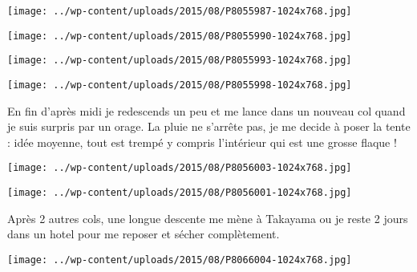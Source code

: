  

\begin{center} \texttt{[image: ../wp-content/uploads/2015/08/P8055987-1024x768.jpg]} \end{center}

 

 

\begin{center} \texttt{[image: ../wp-content/uploads/2015/08/P8055990-1024x768.jpg]} \end{center}

 

 

\begin{center} \texttt{[image: ../wp-content/uploads/2015/08/P8055993-1024x768.jpg]} \end{center}

 

 

\begin{center} \texttt{[image: ../wp-content/uploads/2015/08/P8055998-1024x768.jpg]} \end{center}

 

 En fin d'après midi je redescends un peu et me lance dans un nouveau col quand je suis surpris par un orage. La pluie ne s'arrête pas, je me decide à poser la tente : idée moyenne, tout est trempé y compris l'intérieur qui est une grosse flaque ! 

 

\begin{center} \texttt{[image: ../wp-content/uploads/2015/08/P8056003-1024x768.jpg]} \end{center}

 

 

\begin{center} \texttt{[image: ../wp-content/uploads/2015/08/P8056001-1024x768.jpg]} \end{center}

 

 Après 2 autres cols, une longue descente me mène à Takayama ou je reste 2 jours dans un hotel pour me reposer et sécher complètement. 

 

\begin{center} \texttt{[image: ../wp-content/uploads/2015/08/P8066004-1024x768.jpg]} \end{center}

